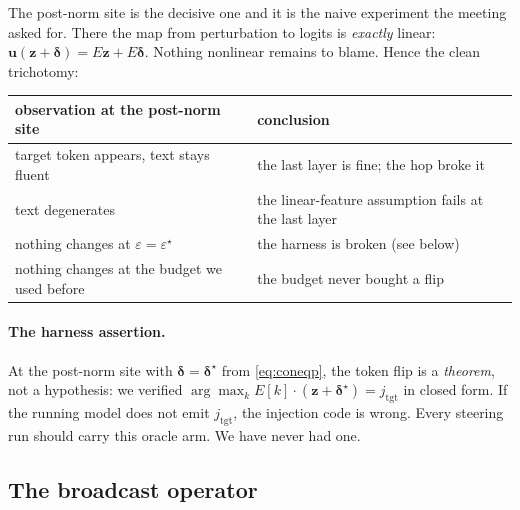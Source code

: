 \documentclass[11pt]{article}
\newcommand{\vz}{\bm{z}}
\newcommand{\vd}{\bm{\delta}}
\begin{document}
The post-norm site is the decisive one and it is the naive experiment the meeting
asked for. There the map from perturbation to logits is \emph{exactly} linear:
$\bm u(\vz + \vd) = E\vz + E\vd$. Nothing nonlinear remains to blame. Hence the
clean trichotomy:

\begin{center}\small
\begin{tabular}{@{}ll@{}}
\toprule
observation at the post-norm site & conclusion \\
\midrule
target token appears, text stays fluent & the last layer is fine; the hop broke it \\
text degenerates & the linear-feature assumption fails at the last layer \\
nothing changes at $\varepsilon = \varepsilon^\star$ & the harness is broken (see below) \\
nothing changes at the budget we used before & the budget never bought a flip \\
\bottomrule
\end{tabular}
\end{center}

\paragraph{The harness assertion.} At the post-norm site with $\vd = \vd^\star$ from
\eqref{eq:coneqp}, the token flip is a \emph{theorem}, not a hypothesis: we verified
$\arg\max_k E[k]\cdot(\vz+\vd^\star) = j_{\mathrm{tgt}}$ in closed form. If the running
model does not emit $j_{\mathrm{tgt}}$, the injection code is wrong. Every steering
run should carry this oracle arm. We have never had one.

\subsection{The broadcast operator}\label{sec:broadcast}
\end{document}
